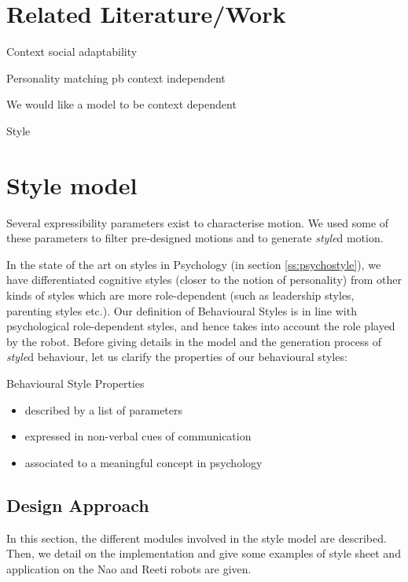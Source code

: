 \documentclass[smallextended]{svjour3}
\begin{document}

\section{Related Literature/Work}
Context social adaptability

Personality matching
pb context independent

We would like a model to be context dependent


Style

\section{Style model}
Several expressibility parameters exist to characterise motion. 
We used some of these parameters to filter pre-designed motions and to generate \textit{style}d motion.

In the state of the art on styles in Psychology (in section \ref{ss:psychostyle}), we have differentiated cognitive styles (closer to the notion of personality) from other kinds of styles which are more role-dependent (such as leadership styles, parenting styles etc.).
Our definition of Behavioural Styles is in line with psychological role-dependent styles, and hence takes into account the role played by the robot.
Before giving details in the model and the generation process of \textit{style}d behaviour, let us clarify the properties of our behavioural styles:
\begin{center}
Behavioural Style Properties
	\begin{itemize}[noitemsep]
		\item described by a list of parameters
		\item expressed in non-verbal cues of communication
		\item associated to a meaningful concept in psychology
	\end{itemize}
\end{center}




\subsection{Design Approach}
In this section, the different modules involved in the style model are described. 
Then, we detail on the implementation and give some examples of style sheet and application on the Nao  and Reeti robots are given.
\end{document}
